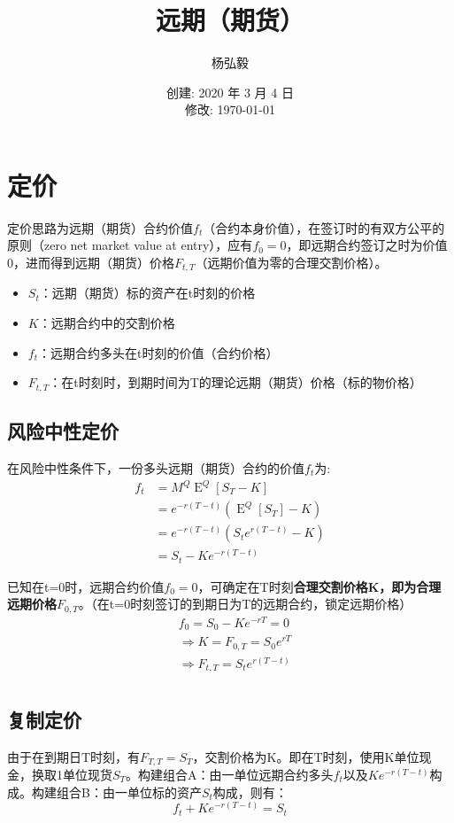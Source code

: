 \documentclass[11pt]{article}
\title{远期（期货）}
\author{杨弘毅}
\date{创建: 2020 年 3 月 4 日 \\修改: \today}
\newcommand{\E}{\operatorname{E}}
\begin{document}
\maketitle

\section{定价}
定价思路为远期（期货）合约价值$f_t$（合约本身价值），在签订时的有双方公平的原则（zero net market value at entry），应有$f_0=0$，即远期合约签订之时为价值0，进而得到远期（期货）价格$F_{t,T}$（远期价值为零的合理交割价格）。
\begin{itemize}
    \setlength{\itemsep}{0em}
    \item $S_t$：远期（期货）标的资产在t时刻的价格
    \item $K$：远期合约中的交割价格
    \item $f_t$：远期合约多头在t时刻的价值（合约价格）
    \item $F_{t,T}$：在t时刻时，到期时间为T的理论远期（期货）价格（标的物价格）
\end{itemize}

\subsection{风险中性定价}
在风险中性条件下，一份多头远期（期货）合约的价值$f_t$为:
\begin{align*}
    f_t &= M^Q \E^Q[S_T - K] \\
     &= e^{-r(T-t)} (\E^Q[S_T] - K) \\
     &= e^{-r(T-t)} ( S_t e^{r(T-t)}- K) \\
     &= S_t - Ke^{-r(T-t)}
\end{align*}

已知在t=0时，远期合约价值$f_0=0$，可确定在T时刻\textbf{合理交割价格K，即为合理远期价格$F_{0,T}$}。（在t=0时刻签订的到期日为T的远期合约，锁定远期价格）
\begin{align*}
    &f_0 = S_0 - Ke^{-rT} = 0 \\
    &\Rightarrow K = F_{0,T} = S_0 e^{rT} \\
    &\Rightarrow F_{t,T} = S_t e^{r(T-t)} \\
\end{align*}

\subsection{复制定价}
由于在到期日T时刻，有$F_{T,T}=S_T$，交割价格为K。即在T时刻，使用K单位现金，换取1单位现货$S_T$。构建组合A：由一单位远期合约多头$f_t$以及$Ke^{-r(T-t)}$构成。构建组合B：由一单位标的资产$S_t$构成，则有：
\begin{equation*}
    f_t + K e^{-r(T-t)} = S_t
\end{equation*}
\end{document}
